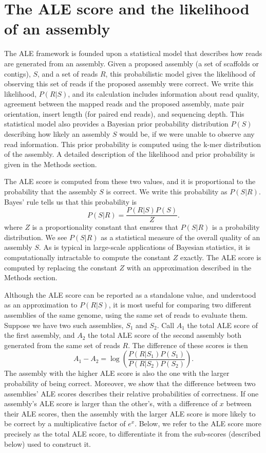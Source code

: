 \documentclass[phd,tocprelim]{cornell}
\begin{document}
\section{The ALE score and the likelihood of an assembly}
The ALE framework is founded upon a statistical model that describes how reads are generated from an assembly.  Given a proposed assembly (a set of scaffolds or contigs), $S$, and a set of reads $R$, this probabilistic model gives the likelihood of observing this set of reads if the proposed assembly were correct.  We write this likelihood, $P(R|S)$, and its calculation includes information about read quality, agreement between the mapped reads and the proposed assembly, mate pair orientation, insert length (for paired end reads), and sequencing depth.  This statistical model also provides a Bayesian prior probability distribution $P(S)$ describing how likely an assembly $S$ would be, if we were unable to observe any read information.   This prior probability is computed using the k-mer distribution of the assembly.  A detailed description of the likelihood and prior probability is given in the Methods section.

The ALE score is computed from these two values, and it is proportional to the probability that the assembly $S$ is correct.  We write this probability as $P(S|R)$.  Bayes’ rule tells us that this probability is 
\begin{equation}
    P(S|R) = \frac{P(R|S)P(S)}{Z}.
\end{equation}
where $Z$ is a proportionality constant that ensures that $P(S|R)$ is a probability distribution.  We see $P(S|R)$ as a statistical measure of the overall quality of an assembly $S$.  As is typical in large-scale applications of Bayesian statistics, it is computationally intractable to compute the constant $Z$ exactly.  The ALE score is computed by replacing the constant $Z$ with an approximation described in the Methods section. 

Although the ALE score can be reported as a standalone value, and understood as an approximation to $P(R|S)$, it is most useful for comparing two different assemblies of the same genome, using the same set of reads to evaluate them. Suppose we have two such assemblies, $S_{1}$ and $S_{2}$.  Call $A_{1}$ the total ALE score of the first assembly, and $A_{2}$ the total ALE score of the second assembly both generated from the same set of reads $R$. The difference of these scores is then
\begin{equation}
    A_{1} - A_{2} = \log\left(\frac{P\left(R|S_{1}\right)P\left(S_{1}\right)}{P\left(R|S_{2}\right)P\left(S_{2}\right)}\right).
\end{equation}
The assembly with the higher ALE score is also the one with the larger probability of being correct.  Moreover, we show that the difference between two assemblies' ALE scores describes their relative probabilities of correctness.  If one assembly's ALE score is larger than the other's, with a difference of $x$ between their ALE scores, then the assembly with the larger ALE score is more likely to be correct by a multiplicative factor of $e^{x}$.  Below, we refer to the ALE score more precisely as the total ALE score, to differentiate it from the sub-scores (described below) used to construct it.
\end{document}
